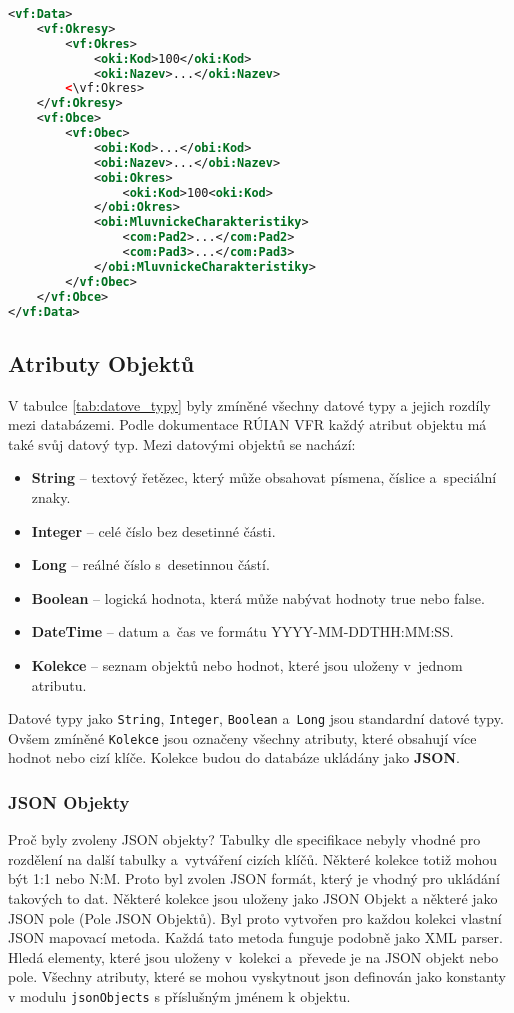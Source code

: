 \begin{lstlisting}[language=xml, caption={Příklad Klasifikátorů}, label=lst:klasifikator]
<vf:Data>
    <vf:Okresy>
        <vf:Okres>
            <oki:Kod>100</oki:Kod>
            <oki:Nazev>...</oki:Nazev>
        <\vf:Okres>
    </vf:Okresy>
    <vf:Obce>
        <vf:Obec>
            <obi:Kod>...</obi:Kod>
            <obi:Nazev>...</obi:Nazev>
            <obi:Okres>
                <oki:Kod>100<oki:Kod>
            </obi:Okres>
            <obi:MluvnickeCharakteristiky>
                <com:Pad2>...</com:Pad2>
                <com:Pad3>...</com:Pad3>
            </obi:MluvnickeCharakteristiky>
        </vf:Obec>
    </vf:Obce>
</vf:Data>
\end{lstlisting}

\subsection{Atributy Objektů}
V tabulce \ref{tab:datove_typy} byly zmíněné všechny datové typy a jejich rozdíly mezi databázemi.
Podle dokumentace RÚIAN VFR \cite{ruian_vfr} každý atribut objektu má také svůj datový typ.
Mezi datovými objektů se nachází:
\begin{itemize}
    \item \textbf{String} -- textový řetězec, který může obsahovat písmena, číslice a~speciální znaky.
    \item \textbf{Integer} -- celé číslo bez desetinné části.
    \item \textbf{Long} -- reálné číslo s~desetinnou částí.
    \item \textbf{Boolean} -- logická hodnota, která může nabývat hodnoty true nebo false.
    \item \textbf{DateTime} -- datum a~čas ve formátu YYYY-MM-DDTHH:MM:SS.
    \item \textbf{Kolekce} -- seznam objektů nebo hodnot, které jsou uloženy v~jednom atributu.
\end{itemize}

Datové typy jako \texttt{String}, \texttt{Integer}, \texttt{Boolean} a~\texttt{Long} jsou standardní datové typy.
Ovšem zmíněné \texttt{Kolekce} jsou označeny všechny atributy, které obsahují více hodnot nebo cizí klíče.
Kolekce budou do databáze ukládány jako \textbf{JSON}.

\subsubsection*{JSON Objekty}
Proč byly zvoleny JSON objekty? Tabulky dle specifikace nebyly vhodné pro rozdělení na další tabulky a~vytváření cizích klíčů.
Některé kolekce totiž mohou být 1:1 nebo N:M. Proto byl zvolen JSON formát, který je vhodný pro ukládání takových to dat.
Některé kolekce jsou uloženy jako JSON Objekt a některé jako JSON pole (Pole JSON Objektů).
Byl proto vytvořen pro každou kolekci vlastní JSON mapovací metoda. Každá tato metoda funguje podobně jako XML parser.
Hledá elementy, které jsou uloženy v~kolekci a~převede je na JSON objekt nebo pole.
Všechny atributy, které se mohou vyskytnout json definován jako konstanty v modulu \texttt{jsonObjects} s příslušným jménem k objektu.

